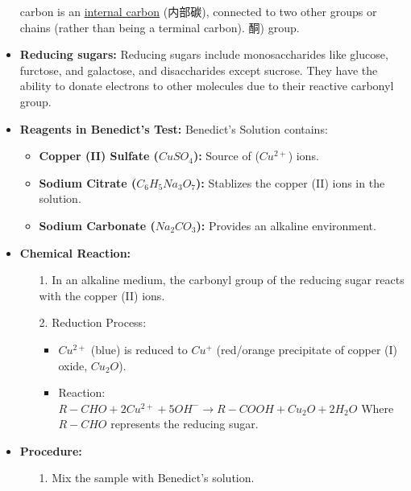\begin{itemize}
{    carbon is an \underline{internal carbon} (内部碳), connected to two other groups or chains (rather than being a terminal
    carbon).} 酮) group.
    \item \textbf{Reducing sugars:} Reducing sugars include monosaccharides like glucose, furctose, and galactose, and
    disaccharides except sucrose. They have the ability to donate electrons to other molecules due to their reactive carbonyl
    group.
    \item \textbf{Reagents in Benedict's Test:} Benedict's Solution contains:
    \begin{itemize}
        \item \textbf{Copper (II) Sulfate ($CuSO_4$):} Source of ($Cu^{2+}$) ions.
        \item \textbf{Sodium Citrate ($C_6H_5Na_3O_7$):} Stablizes the copper (II) ions in the solution.
        \item \textbf{Sodium Carbonate ($Na_2CO_3$):} Provides an alkaline environment.
    \end{itemize}
    \item \textbf{Chemical Reaction:}
    \begin{itemize}
        \item[1.] In an alkaline medium, the carbonyl group of the reducing sugar reacts with the copper (II) ions.
        \item[2.] Reduction Process:
        \begin{itemize}
            \item $Cu^{2+}$ (blue) is reduced to $Cu^+$ (red/orange precipitate of copper (I) oxide, $Cu_2O$).
            \item Reaction: $R-CHO + 2Cu^{2+} + 5OH^- \rightarrow R-COOH + Cu_2O + 2H_2O$ Where $R-CHO$ represents the reducing
            sugar.
        \end{itemize} 
    \end{itemize}
    \item \textbf{Procedure:}
    \begin{itemize}
        \item[1.] Mix the sample with Benedict's solution.

\end{itemize}
\end{itemize}
